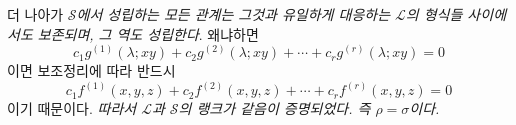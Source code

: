 
더 나아가 \emph{$\mathcal S$에서 성립하는 모든 관계는 그것과 유일하게 대응하는 $\mathcal L$의 형식들 사이에서도 보존되며, 그 역도 성립한다}. 왜냐하면
\[
  c_1g^{(1)}(\lambda;xy)+c_2g^{(2)}(\lambda;xy)+\cdots+c_rg^{(r)}(\lambda;xy)=0
\]
이면 보조정리에 따라 반드시
\[
  c_1f^{(1)}(x,y,z)+c_2f^{(2)}(x,y,z)+\cdots+c_rf^{(r)}(x,y,z)=0
\]
이기 때문이다. \emph{따라서 $\mathcal L$과 $\mathcal S$의 랭크가 같음이 증명되었다. 즉 $\rho=\sigma$이다.}
